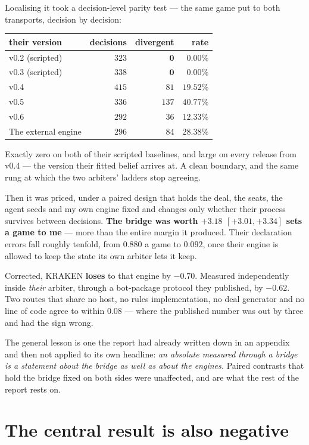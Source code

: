 \documentclass[11pt,a4paper]{article}
\begin{document}
Localising it took a decision-level parity test --- the same game put to both
transports, decision by decision:

\begin{center}
\small
\begin{tabular}{lrrr}
\toprule
their version & decisions & divergent & rate \\
\midrule
v0.2 (scripted) & $323$ & $\mathbf{0}$ & $0.00\%$ \\
v0.3 (scripted) & $338$ & $\mathbf{0}$ & $0.00\%$ \\
v0.4 & $415$ & $81$ & $19.52\%$ \\
v0.5 & $336$ & $137$ & $40.77\%$ \\
v0.6 & $292$ & $36$ & $12.33\%$ \\
The external engine & $296$ & $84$ & $28.38\%$ \\
\bottomrule
\end{tabular}
\end{center}

Exactly zero on both of their scripted baselines, and large on every release
from v0.4 --- the version their fitted belief arrives at. A clean boundary, and
the same rung at which the two arbiters' ladders stop agreeing.

Then it was priced, under a paired design that holds the deal, the seats, the
agent seeds and my own engine fixed and changes only whether their process
survives between decisions. \textbf{The bridge was worth $+3.18$ $[+3.01,
+3.34]$ sets a game to me} --- more than the entire margin it produced. Their
declaration errors fall roughly tenfold, from $0.880$ a game to $0.092$, once
their engine is allowed to keep the state its own arbiter lets it keep.

Corrected, KRAKEN \textbf{loses} to that engine by $-0.70$. Measured
independently inside \emph{their} arbiter, through a bot-package protocol they
published, by $-0.62$. Two routes that share no host, no rules implementation,
no deal generator and no line of code agree to within $0.08$ --- where the
published number was out by three and had the sign wrong.

The general lesson is one the report had already written down in an appendix
and then not applied to its own headline: \emph{an absolute measured through a
bridge is a statement about the bridge as well as about the engines.} Paired
contrasts that hold the bridge fixed on both sides were unaffected, and are
what the rest of the report rests on.

\section{The central result is also negative}
\end{document}

